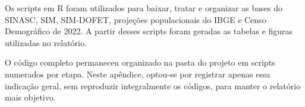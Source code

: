 Os scripts em R foram utilizados para baixar, tratar e organizar as bases do SINASC, SIM, SIM-DOFET, projeções populacionais do IBGE e Censo Demográfico de 2022. A partir desses scripts foram geradas as tabelas e figuras utilizadas no relatório.

O código completo permaneceu organizado na pasta do projeto em scripts numerados por etapa. Neste apêndice, optou-se por registrar apenas essa indicação geral, sem reproduzir integralmente os códigos, para manter o relatório mais objetivo.
